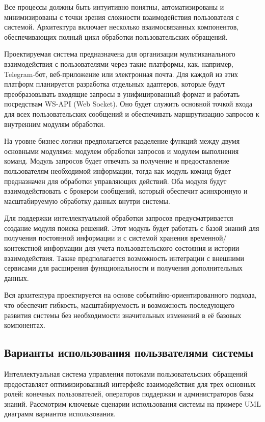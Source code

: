 Все процессы должны быть интуитивно понятны, автоматизированы и минимизированы с точки зрения сложности взаимодействия пользователя с системой. Архитектура включает несколько взаимосвязанных компонентов, обеспечивающих полный цикл обработки пользовательских обращений.


Проектируемая система предназначена для организации мультиканального взаимодействия с пользователями через такие платформы, как, например, Telegram-бот, веб-приложение или электронная почта. Для каждой из этих платформ планируется разработка отдельных адаптеров, которые будут преобразовывать входящие запросы в унифицированный формат и работать посредствам WS-API (Web Socket\cite{ws}). Оно будет служить основной точкой входа для всех пользовательских сообщений и обеспечивать маршрутизацию запросов к внутренним модулям обработки.

На уровне бизнес-логики предполагается разделение функций между двумя основными модулями: модулем обработки запросов и модулем выполнения команд. Модуль запросов будет отвечать за получение и предоставление пользователям необходимой информации, тогда как модуль команд будет предназначен для обработки управляющих действий. Оба модуля будут взаимодействовать с брокером сообщений, который обеспечит асинхронную и масштабируемую обработку данных внутри системы.

Для поддержки интеллектуальной обработки запросов предусматривается создание модуля поиска решений. Этот модуль будет работать с базой знаний для получения постоянной информации и с системой хранения временной/контекстной информации для учета пользовательского состояния и истории взаимодействия. Также предполагается возможность интеграции с внешними сервисами для расширения функциональности и получения дополнительных данных.

Вся архитектура проектируется на основе событийно-ориентированного подхода, что обеспечит гибкость, масштабируемость и возможность последующего развития системы без необходимости значительных изменений в её базовых компонентах.


\subsection{Варианты использования пользвателями системы}

Интеллектуальная система управления потоками пользовательских обращений предоставляет оптимизированный интерфейс взаимодействия для трех основных ролей: конечных пользователей, операторов поддержки и администраторов базы знаний. Рассмотрим ключевые сценарии использования системы на примере UML диаграмм вариантов использования.


